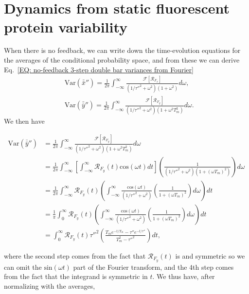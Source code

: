\documentclass[%
 reprint,prx,
superscriptaddress,
%
%
%
%
%
%
%
%
%
 amsmath,amssymb,
 aps,
%
%
%
%
%
%
]{revtex4-2}
\begin{document}
{{
\section{Dynamics from static fluorescent protein variability}\label{Appendix section on time-scales for fluorescent reporters}
\label{SEC: Appendix dynamics fluorescent proteins}
When there is no feedback, we can write down the time-evolution equations for the averages of the conditional probability space, and from these we can derive Eq.~\eqref{EQ: no-feedback 3-step double bar variances from Fourier}
\begin{align*}
 &\text{Var}(\bar{\bar{x}}'') = \frac{1}{2\pi}\int_{-\infty}^{\infty}\frac{\mathcal{F}[\mathcal{R}_{F_{x}}]}{(1/\tau''^{2} + \omega^{2})(1 + \omega^{2})}d\omega ,
 \\ &\text{Var}(\bar{\bar{y}}'') = \frac{1}{2\pi}\int_{-\infty}^{\infty}\frac{\mathcal{F}[\mathcal{R}_{F_{y}}]}{(1/\tau''^{2} + \omega^{2})(1 + \omega^{2}T_{m}^{2})}d\omega  .
\end{align*}
We then have
\begin{widetext}
\begin{align*}
    \text{Var}(\bar{\bar{y}}'') &= \frac{1}{2\pi}\int_{-\infty}^{\infty}\frac{\mathcal{F}[\mathcal{R}_{F_{y}}]}{(1/\tau''^{2} + \omega^{2})(1 + \omega^{2}T_{m}^{2})}d\omega   \\
    &= \frac{1}{2\pi}\int_{-\infty}^{\infty}\left[\int_{-\infty}^{\infty}\mathcal{R}_{F_{y}}(t)\text{cos}(\omega t)dt\right]\left(\frac{1}{(1/\tau''^{2} + \omega^{2})(1+(\omega T_{m})^{2})}\right) d\omega   \\
    &= \frac{1}{2\pi}\int_{-\infty}^{\infty}\mathcal{R}_{F_{y}}(t) \left(\int_{-\infty}^{\infty}\frac{\text{cos}(\omega t)}{(1/\tau''^{2} + \omega^{2})}\left(\frac{1}{1+(\omega T_{m})^{2}}\right) d\omega \right)dt   \\
    &= \frac{1}{\pi}\int_{0}^{\infty}\mathcal{R}_{F_{y}}(t) \left(\int_{-\infty}^{\infty}\frac{\text{cos}(\omega t)}{(1/\tau''^{2} + \omega^{2})}\left(\frac{1}{1+(\omega T_{m})^{2}}\right) d\omega \right)dt   \\
    &= \int_{0}^{\infty}\mathcal{R}_{F_{y}}(t) \tau''^{2} \left( \frac{T_{m}e^{-t/T_{m}} - \tau''e^{-t/\tau''} }{T_{m}^{2} - \tau''^2} \right)dt  ,
\end{align*}
\end{widetext}
where the second step comes from the fact that $\mathcal{R}_{F_{y}}(t)$ is    and symmetric so we can omit the $\text{sin}(\omega t)$ part of the Fourier transform, and the 4th 
step comes from the fact that the integrand is symmetric in $t$. We thus have, after normalizing with the averages, 
}}
\end{document}
